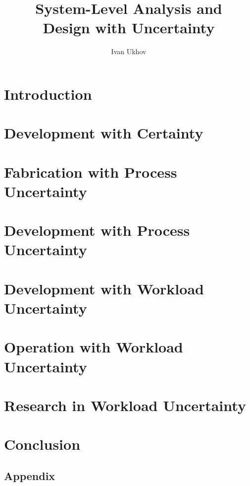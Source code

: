 \documentclass{thesis}
\title{
  System-Level Analysis and\\[0.3em]
  Design with Uncertainty
}
\author{Ivan Ukhov}
\begin{document}
\nocite{ukhov2012, ukhov2014a, ukhov2014b, ukhov2015, ukhov2017a, ukhov2017b}

\chapter{Introduction}
\newcommand{\inputsection}{}


\chapter{Development with Certainty}
\renewcommand{\inputsection}[1]{}


\chapter{Fabrication with Process Uncertainty}
\renewcommand{\inputsection}[1]{}


\chapter{Development with Process Uncertainty}
\renewcommand{\inputsection}[1]{}


\chapter{Development with Workload Uncertainty}
\renewcommand{\inputsection}[1]{}


\chapter{Operation with Workload Uncertainty}
\renewcommand{\inputsection}[1]{}


\chapter{Research in Workload Uncertainty}
\renewcommand{\inputsection}[1]{}


\chapter{Conclusion}


\begin{appendices}
\chapter{Appendix}
\renewcommand{\inputsection}[1]{}

\end{appendices}

\printbibliography
\end{document}
